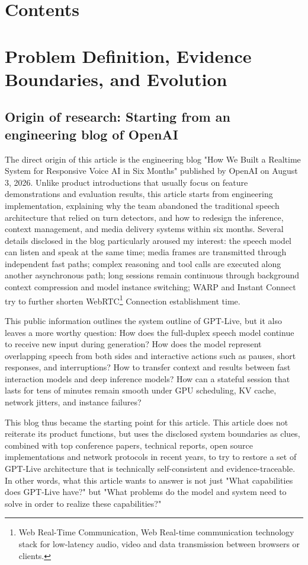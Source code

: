 \documentclass[UTF8,fontset=none,a4paper,10pt]{ctexart}
\makeatletter
\renewcommand{\contentsname}{Contents}
\def\BilingualTocExtension{entoc}
\renewcommand{\tableofcontents}{%
  \section*{\contentsname
    \@mkboth{\MakeUppercase\contentsname}{\MakeUppercase\contentsname}}%
  \@starttoc{\BilingualTocExtension}%
}
\makeatother
\begin{document}
\clearpage
\begingroup
\small
\setlength{\parskip}{0pt}
\linespread{1.02}\selectfont
\setcounter{tocdepth}{2}
\tableofcontents
\endgroup
\clearpage

\section{Problem Definition, Evidence Boundaries, and Evolution}

\subsection{Origin of research: Starting from an engineering blog of OpenAI}

The direct origin of this article is the engineering blog "How We Built a Realtime System for Responsive Voice AI in Six Months" \cite{en:openai2026continuous} published by OpenAI on August 3, 2026. Unlike product introductions that usually focus on feature demonstrations and evaluation results, this article starts from engineering implementation, explaining why the team abandoned the traditional speech architecture that relied on turn detectors, and how to redesign the inference, context management, and media delivery systems within six months. Several details disclosed in the blog particularly aroused my interest: the speech model can listen and speak at the same time; media frames are transmitted through independent fast paths; complex reasoning and tool calls are executed along another asynchronous path; long sessions remain continuous through background context compression and model instance switching; WARP and Instant Connect try to further shorten WebRTC\footnote{Web Real-Time Communication, Web Real-time communication technology stack for low-latency audio, video and data transmission between browsers or clients. } Connection establishment time.

This public information outlines the system outline of GPT-Live, but it also leaves a more worthy question: How does the full-duplex speech model continue to receive new input during generation? How does the model represent overlapping speech from both sides and interactive actions such as pauses, short responses, and interruptions? How to transfer context and results between fast interaction models and deep inference models? How can a stateful session that lasts for tens of minutes remain smooth under GPU scheduling, KV cache, network jitters, and instance failures?

This blog thus became the starting point for this article. This article does not reiterate its product functions, but uses the disclosed system boundaries as clues, combined with top conference papers, technical reports, open source implementations and network protocols in recent years, to try to restore a set of GPT-Live architecture that is technically self-consistent and evidence-traceable. In other words, what this article wants to answer is not just "What capabilities does GPT-Live have?" but "What problems do the model and system need to solve in order to realize these capabilities?"
\end{document}
